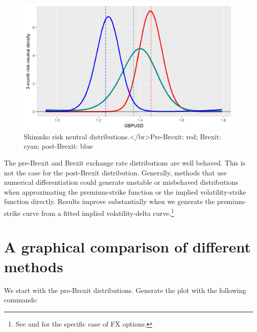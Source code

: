 \documentclass[]{book}
\let\rmarkdownfootnote\footnote%
\def\footnote{\protect\rmarkdownfootnote}
\theoremstyle{definition}
\theoremstyle{definition}
\theoremstyle{definition}
\theoremstyle{remark}
\begin{document}
\begin{figure}
\includegraphics[width=1\linewidth]{images/unnamed-chunk-65-1} \caption{Shimnko risk neutral distributions.</br>Pre-Brexit: red; Brexit: cyan; post-Brexit: blue}\label{fig:unnamed-chunk-65}
\end{figure}

The pre-Brexit and Brexit exchange rate distributions are well behaved.
This is not the case for the post-Brexit distribution. Generally,
methods that use numerical differentiation could generate unstable or
misbehaved distributions when approximating the premium-strike function
or the implied volatility-strike function directly. Results improve
substantially when we generate the premium-strike curve from a fitted
implied volatility-delta curve.\footnote{See \citet{Malz1997} and
  \citet{Malz2014} for the specific case of FX options.}

\section{A graphical comparison of different
methods}\label{a-graphical-comparison-of-different-methods}

We start with the pre-Brexit distributions. Generate the plot with the
following commands:
\end{document}
